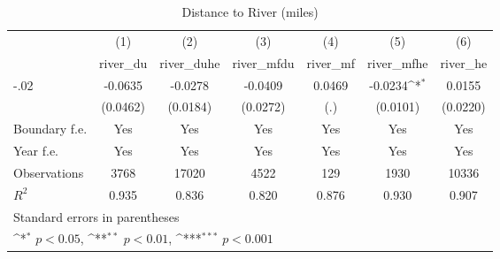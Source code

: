 \begin{table}[htbp]\centering
\def\sym#1{\ifmmode^{#1}\else\(^{#1}\)\fi}
\caption{Distance to River (miles)}
\begin{tabular}{l*{6}{c}}
\hline\hline
                    &\multicolumn{1}{c}{(1)}&\multicolumn{1}{c}{(2)}&\multicolumn{1}{c}{(3)}&\multicolumn{1}{c}{(4)}&\multicolumn{1}{c}{(5)}&\multicolumn{1}{c}{(6)}\\
                    &\multicolumn{1}{c}{river\_du}&\multicolumn{1}{c}{river\_duhe}&\multicolumn{1}{c}{river\_mfdu}&\multicolumn{1}{c}{river\_mf}&\multicolumn{1}{c}{river\_mfhe}&\multicolumn{1}{c}{river\_he}\\
\hline
-.02                &     -0.0635         &     -0.0278         &     -0.0409         &      0.0469         &     -0.0234\sym{*}  &      0.0155         \\
                    &    (0.0462)         &    (0.0184)         &    (0.0272)         &         (.)         &    (0.0101)         &    (0.0220)         \\
[1em]
Boundary f.e.       &         Yes         &         Yes         &         Yes         &         Yes         &         Yes         &         Yes         \\
[1em]
Year f.e.           &         Yes         &         Yes         &         Yes         &         Yes         &         Yes         &         Yes         \\
\hline
Observations        &        3768         &       17020         &        4522         &         129         &        1930         &       10336         \\
\(R^{2}\)           &       0.935         &       0.836         &       0.820         &       0.876         &       0.930         &       0.907         \\
\hline\hline
\multicolumn{7}{l}{\footnotesize Standard errors in parentheses}\\
\multicolumn{7}{l}{\footnotesize \sym{*} \(p<0.05\), \sym{**} \(p<0.01\), \sym{***} \(p<0.001\)}\\
\end{tabular}
\end{table}
